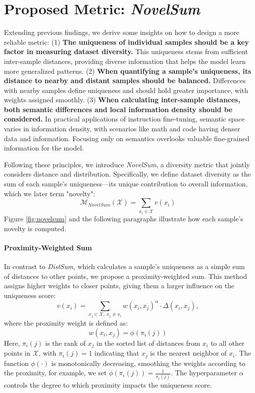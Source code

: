 \section{Proposed Metric: \textit{NovelSum}}
Extending previous findings, we derive some insights on how to design a more reliable metric: (1) \textbf{The uniqueness of individual samples should be a key factor in measuring dataset diversity.} This uniqueness stems from sufficient inter-sample distances, providing diverse information that helps the model learn more generalized patterns. (2) \textbf{When quantifying a sample's uniqueness, its distance to nearby and distant samples should be balanced.} Differences with nearby samples define uniqueness and should hold greater importance, with weights assigned smoothly. (3) \textbf{When calculating inter-sample distances, both semantic differences and local information density should be considered.} In practical applications of instruction fine-tuning, semantic space varies in information density, with scenarios like math and code having denser data and information. Focusing only on semantics overlooks valuable fine-grained information for the model.

Following these principles, we introduce \textit{NovelSum}, a diversity metric that jointly considers distance and distribution. Specifically, we define dataset diversity as the sum of each sample's uniqueness---its unique contribution to overall information, which we later term "novelty":
\begin{equation}
\label{eq:def}
    \mathcal{M}_{NovelSum}(\mathcal{X}) = \sum_{x_i \in \mathcal{X}} v(x_i)
\end{equation}
Figure \ref{fig:novelsum} and the following paragraphs illustrate how each sample's novelty is computed.

\paragraph{Proximity-Weighted Sum}
In contrast to \textit{DistSum}, which calculates a sample’s uniqueness as a simple sum of distances to other points, we propose a proximity-weighted sum. This method assigns higher weights to closer points, giving them a larger influence on the uniqueness score:
\begin{equation}
\label{eq:pws}
    v(x_i) = \sum_{x_j \in \mathcal{X},\ x_j \neq x_i} w(x_i, x_j)^{\alpha} \cdot \Delta(x_i, x_j),
\end{equation}
where the proximity weight is defined as:
\begin{equation*}
    w(x_i, x_j) = \phi(\pi_i(j))
\end{equation*}
Here, \( \pi_i(j) \) is the rank of \( x_j \) in the sorted list of distances from \( x_i \) to all other points in \( \mathcal{X} \), with \( \pi_i(j) = 1 \) indicating that \( x_j \) is the nearest neighbor of \( x_i \). The function \( \phi(\cdot) \) is monotonically decreasing, smoothing the weights according to the proximity, for example, we set \( \phi(\pi_i(j)) = \frac{1}{\pi_i(j)} \). The hyperparameter \( \alpha \) controls the degree to which proximity impacts the uniqueness score.

